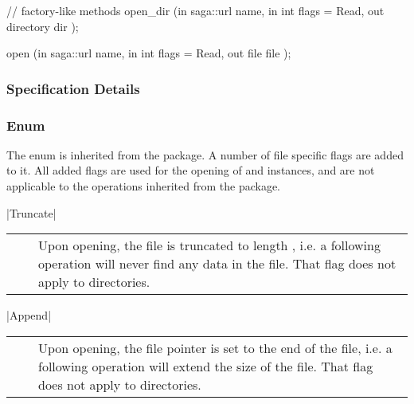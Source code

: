 \begin{myspec}
{{      // factory-like methods
      open_dir    (in    saga::url         name,
                   in    int               flags = Read,
                   out   directory         dir      );
 
      open        (in    saga::url         name,
                   in    int               flags = Read,
                   out   file              file     );
    }
  }
 \end{myspec}
 
 
 \subsubsection{Specification Details}
 
  \subsubsection*{Enum }
 
  The  enum is inherited from the
   package.  A number of file specific flags are
  added to it.  All added flags are used for the opening of
   and  instances, and are not applicable
  to the operations inherited from the  package.
  
    |Truncate|\\[0.3mm]
    \begin{tabular}{cp{110mm}}
      ~~ & Upon opening, the file is truncated to length 
           \T{0}, i.e. a following \T{read()} operation will 
           never find any data in the file.  That flag does not 
           apply to directories.
    \end{tabular}
 
    |Append|\\[0.3mm]
    \begin{tabular}{cp{110mm}}
      ~~ & Upon opening, the file pointer is set to the 
           end of the file, i.e. a following \T{write()} 
           operation will extend the size of the file.  That 
           flag does not apply to directories.
    \end{tabular}
 
